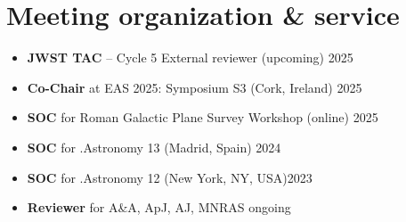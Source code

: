 \section*{Meeting organization \& service}

\begin{itemize}
    \item \textbf{JWST TAC} -- Cycle 5 External reviewer \hfill (upcoming) 2025
    \item \textbf{Co-Chair} at EAS 2025: Symposium S3 (Cork, Ireland) \hfill 2025
    \item \textbf{SOC} for Roman Galactic Plane Survey Workshop (online) \hfill 2025
    \item \textbf{SOC} for .Astronomy 13 (Madrid, Spain) \hfill 2024
    \item \textbf{SOC} for .Astronomy 12 (New York, NY, USA)\hfill 2023
    \item \textbf{Reviewer} for A\&A, ApJ, AJ, MNRAS \hfill ongoing
\end{itemize}